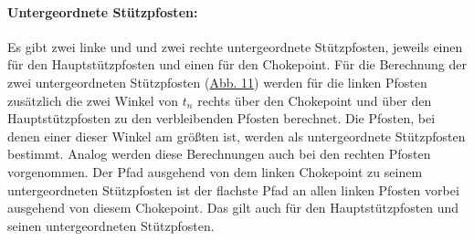 \paragraph{Untergeordnete Stützpfosten:}
Es gibt zwei linke und und zwei rechte untergeordnete Stützpfosten, jeweils einen für den Hauptstützpfosten und einen für den Chokepoint.
Für die Berechnung der zwei untergeordneten Stützpfosten (\hyperref[fig:unterpfosten]{Abb. 11}) werden für die linken Pfosten zusätzlich die zwei Winkel von $t_n$ rechts über den Chokepoint und über den Hauptstützpfosten zu den verbleibenden Pfosten berechnet. Die Pfosten, bei denen einer dieser Winkel am größten ist, werden als untergeordnete Stützpfosten bestimmt. Analog werden diese Berechnungen auch bei den rechten Pfosten vorgenommen. Der Pfad ausgehend von dem linken Chokepoint zu seinem untergeordneten Stützpfosten ist der flachste Pfad an allen linken Pfosten vorbei ausgehend von diesem Chokepoint. Das gilt auch für den Hauptstützpfosten und seinen untergeordneten Stützpfosten.

